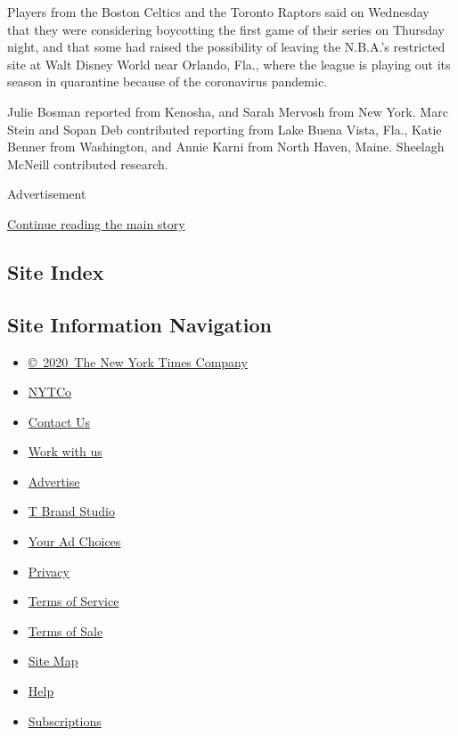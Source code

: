 Players from the Boston Celtics and the Toronto Raptors said on
Wednesday that they were considering boycotting the first game of their
series on Thursday night, and that some had raised the possibility of
leaving the N.B.A.'s restricted site at Walt Disney World near Orlando,
Fla., where the league is playing out its season in quarantine because
of the coronavirus pandemic.

Julie Bosman reported from Kenosha, and Sarah Mervosh from New York.
Marc Stein and Sopan Deb contributed reporting from Lake Buena Vista,
Fla., Katie Benner from Washington, and Annie Karni from North Haven,
Maine. Sheelagh McNeill contributed research.

Advertisement

\protect\hyperlink{after-bottom}{Continue reading the main story}

\hypertarget{site-index}{%
\subsection{Site Index}\label{site-index}}

\hypertarget{site-information-navigation}{%
\subsection{Site Information
Navigation}\label{site-information-navigation}}

\begin{itemize}
\tightlist
\item
  \href{https://help.nytimes3xbfgragh.onion/hc/en-us/articles/115014792127-Copyright-notice}{©~2020~The
  New York Times Company}
\end{itemize}

\begin{itemize}
\tightlist
\item
  \href{https://www.nytco.com/}{NYTCo}
\item
  \href{https://help.nytimes3xbfgragh.onion/hc/en-us/articles/115015385887-Contact-Us}{Contact
  Us}
\item
  \href{https://www.nytco.com/careers/}{Work with us}
\item
  \href{https://nytmediakit.com/}{Advertise}
\item
  \href{http://www.tbrandstudio.com/}{T Brand Studio}
\item
  \href{https://www.nytimes3xbfgragh.onion/privacy/cookie-policy\#how-do-i-manage-trackers}{Your
  Ad Choices}
\item
  \href{https://www.nytimes3xbfgragh.onion/privacy}{Privacy}
\item
  \href{https://help.nytimes3xbfgragh.onion/hc/en-us/articles/115014893428-Terms-of-service}{Terms
  of Service}
\item
  \href{https://help.nytimes3xbfgragh.onion/hc/en-us/articles/115014893968-Terms-of-sale}{Terms
  of Sale}
\item
  \href{https://spiderbites.nytimes3xbfgragh.onion}{Site Map}
\item
  \href{https://help.nytimes3xbfgragh.onion/hc/en-us}{Help}
\item
  \href{https://www.nytimes3xbfgragh.onion/subscription?campaignId=37WXW}{Subscriptions}
\end{itemize}
